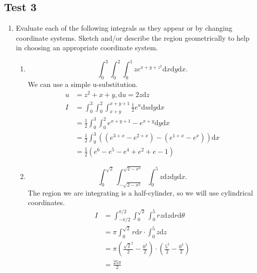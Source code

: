 \subsection{Test 3}
\begin{enumerate}
	\item Evaluate each of the following integrals as they appear or by changing coordinate systems. Sketch and/or describe the region geometrically to help in choosing an appropriate coordinate system.
	\begin{enumerate}[label=\alph*.]
		\item \begin{equation*}
			\int_{0}^{3}{\int_{0}^{2}{\int_{0}^{1}{ze^{x+y+z^2}\mathrm{d}x}\mathrm{d}y}\mathrm{d}x}.
		\end{equation*}
		We can use a simple u-substitution.
		\begin{align*}
			u &= z^2 + x + y, \mathrm{d}u = 2z\mathrm{d}z \\
			I &= \int_{0}^{3}{\int_{0}^{2}{\int_{x+y}^{x+y+1}{\frac{1}{2}e^{u}\mathrm{d}u}\mathrm{d}y}\mathrm{d}x} \\
			&= \frac{1}{2}\int_{0}^{3}{\int_{0}^{2}{e^{x+y+1} - e^{x+y}\mathrm{d}y}\mathrm{d}x} \\
			&= \frac{1}{2}\int_{0}^{3}{\left((e^{3+x}-e^{2+x}) - (e^{1+x}-e^{x})\right)\mathrm{d}x} \\
			&= \frac{1}{2}(e^6 - e^5 - e^4 + e^2 + e - 1)
		\end{align*}
		
		\item \begin{equation*}
			\int_{0}^{\sqrt{2}}{\int_{-\sqrt{2-x^2}}^{\sqrt{2-x^2}}{\int_{0}^{5}{z\mathrm{d}z}\mathrm{d}y}\mathrm{d}x}.
		\end{equation*}
		The region we are integrating is a half-cylinder, so we will use cylindrical coordinates.
		\begin{align*}
			I &= \int_{-\pi/2}^{\pi/2}{\int_{0}^{\sqrt{2}}{\int_{0}^{5}{rz\mathrm{d}z}\mathrm{d}r}\mathrm{d}\theta} \\
			&= \pi\int_{0}^{\sqrt{2}}{r\mathrm{d}r}\cdot\int_{0}^{5}{z\mathrm{d}z} \\
			&= \pi\left(\frac{\sqrt{2}^{2}}{2} - \frac{0^2}{2}\right) \cdot \left(\frac{5^2}{2} - \frac{0^2}{2}\right) \\	
			&= \frac{25\pi}{2}
		\end{align*}
		

\end{enumerate}
\end{enumerate}
